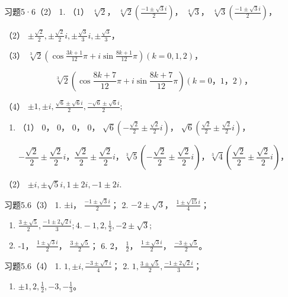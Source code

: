 习题5·6（2） 1. （1） \(\sqrt[4]{2}\)，
\(\sqrt[4]{2}\left(\frac{-1\pm\sqrt{3}i}{2}\right)\)， \(\sqrt[4]{3}\)，
\(\sqrt[4]{3}\left(\frac{-1\pm\sqrt{3}i}{2}\right)\)，

（2）
\(\pm \frac{\sqrt{2}}{2}, \pm \frac{\sqrt{2}}{2} i, \pm \frac{\sqrt{3}}{3} i, \pm \frac{\sqrt{3}}{3}\)，

（3）
\(\sqrt[3]{2}\left(\cos \frac{3k + 1}{12}\pi + i\sin \frac{8k + 1}{12}\pi\right) (k = 0, 1, 2)\)，

\[
\sqrt[3]{2} \left(\cos \frac {8 k + 7}{12} \pi + i \sin \frac {8 k + 7}{12} \pi\right) (k = 0\text{，} 1\text{，} 2)\text{，}
\]

（4）
\(\pm 1, \pm i, \frac{\sqrt{6} \pm \sqrt{6}i}{2}, \frac{-\sqrt{6} \pm \sqrt{6}i}{2};\)

\begin{enumerate}[start=2]
\item
  （1） 0， 0， 0， 0，
  \(\sqrt{6}\left(-\frac{\sqrt{2}}{2} \pm \frac{\sqrt{2}}{2} i\right)\)，
  \(\sqrt{6}\left(\frac{\sqrt{2}}{2} \pm \frac{\sqrt{2}}{2} i\right)\)，
\end{enumerate}

\[
- \frac {\sqrt {2}}{2} \pm \frac {\sqrt {2}}{2} i\text{，} \frac {\sqrt {2}}{2} \pm \frac {\sqrt {2}}{2} i\text{，} \sqrt[3]{5} \left(- \frac {\sqrt {2}}{2} \pm \frac {\sqrt {2}}{2} i\right)\text{，} \sqrt[3]{4} \left(\frac {\sqrt {2}}{2} \pm \frac {\sqrt {2}}{2} i\right)\text{，}
\]

（2） \(\pm i, \pm \sqrt{5} i, 1 \pm 2i, -1 \pm 2i.\)

习题5.6（3） 1. ±i， \(\frac{-1\pm\sqrt{3}i}{2}\)； 2.
\(-2\pm\sqrt{3}\)， \(\frac{1\pm\sqrt{15}i}{4}\)；

\begin{enumerate}[start=3]
\item
  \(\frac{3\pm\sqrt{5}}{2}, \frac{-1\pm2\sqrt{2}i}{3}; 4. -1, 2, \frac{1}{2}, -2\pm\sqrt{3};\)
\item
  -1， \(\frac{1\pm\sqrt{3}i}{2}\)， \(\frac{3\pm\sqrt{5}}{2}\)； 6. 2，
  \(\frac{1}{2}\)， \(\frac{1\pm\sqrt{3}i}{2}\)，
  \(\frac{-3\pm\sqrt{5}}{2}\)。
\end{enumerate}

习题5.6（4） 1. \(1, \pm i, \frac{-3 \pm \sqrt{7} i}{4}\)； 2.
\(1, \frac{3 \pm \sqrt{5}}{2}, \frac{-1 \pm 2\sqrt{2} i}{3}\)；

\begin{enumerate}[start=3]
\item
  \(\pm 1, 2, \frac{1}{2}, -3, -\frac{1}{3}\)。
\end{enumerate}

